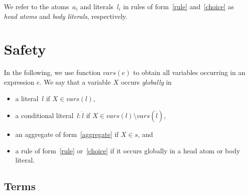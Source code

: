 \documentclass{article}
\newcommand{\tuple}[1]{\dot{#1}}
\newcommand\Vars{\mathit{vars}}
\begin{document}
	We refer to the atoms~$a_i$ and literals~$l_i$ in rules of form~\eqref{rule} and~\eqref{choice} as \emph{head atoms} and \emph{body literals}, respectively.

	\section{Safety}

	In the following, we use function $\Vars(e)$ to obtain all variables occurring in an expression $e$.
	We say that a variable $X$ occurs \emph{globally} in
	\begin{itemize}
		\item a literal~$l$ if $X \in \Vars(l)$,
		\item a conditional literal~$l : \tuple{l}$ if $X \in \Vars(l) \setminus \Vars(\tuple{l})$,
		\item an aggregate of form~\eqref{aggregate} if $X \in s$, and
		\item a rule of form~\eqref{rule} or~\eqref{choice} if it occurs globally in a head atom or body literal.
	\end{itemize}

	\subsection{Terms}
\end{document}
